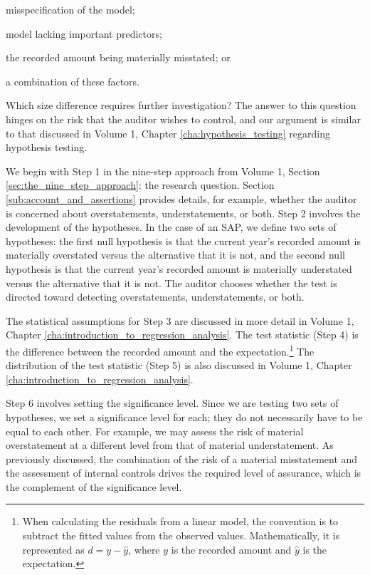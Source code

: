 \begin{compactitem}
\item misspecification of the model;
\item model lacking important predictors;
\item the recorded amount being materially misstated; or
\item a combination of these factors. 
\end{compactitem}

\bigskip
Which size difference requires further investigation? The answer to this question hinges on the risk that the auditor wishes to control, and our argument is similar to that discussed in Volume 1, Chapter \ref{cha:hypothesis_testing} regarding hypothesis testing. 

We begin with Step 1 in the nine-step approach from Volume 1, Section \ref{sec:the_nine_step_approach}: the research question. Section \ref{sub:account_and_assertions} provides details, for example, whether the auditor is concerned about overstatements, understatements, or both.
Step 2 involves the development of the hypotheses. In the case of an SAP, we define two sets of hypotheses: the first null hypothesis is that the current year’s recorded amount is materially overstated versus the alternative that it is not, and the second null hypothesis is that the current year’s recorded amount is materially understated versus the alternative that it is not. The auditor chooses whether the test is directed toward detecting overstatements, understatements, or both.

The statistical assumptions for Step 3 are discussed in more detail in Volume 1, Chapter \ref{cha:introduction_to_regression_analysis}. The test statistic (Step 4) is the difference between the recorded amount and the expectation.\footnote{When calculating the residuals from a linear model, the convention is to subtract the fitted values from the observed values. Mathematically, it is represented as $d = y - \hat{y}$, where $y$ is the recorded amount and $\hat{y}$ is the expectation.} The distribution of the test statistic (Step 5) is also discussed in Volume 1, Chapter \ref{cha:introduction_to_regression_analysis}.

Step 6 involves setting the significance level. Since we are testing two sets of hypotheses, we set a significance level for each; they do not necessarily have to be equal to each other. For example, we may assess the risk of material overstatement at a different level from that of material understatement. As previously discussed, the combination of the risk of a material misstatement and the assessment of internal controls drives the required level of assurance, which is the complement of the significance level.

